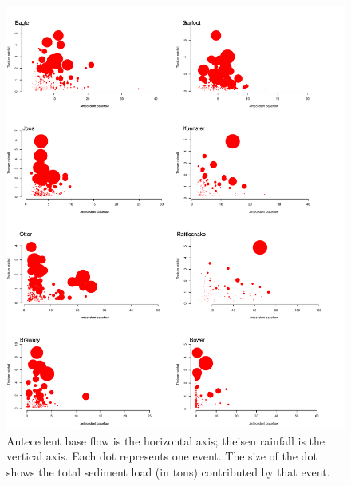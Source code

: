 \documentclass[10pt]{article}
\begin{document}
\begin{figure}
    \begin{center}
\includegraphics{loadings-figure4}
    \end{center}
    \caption{Antecedent base flow is the horizontal axis; theisen rainfall is the vertical axis. Each dot represents one event. The size of the dot shows the total sediment load (in tons) contributed by that event. \label{bubbles}}
\end{figure}




\end{document}
